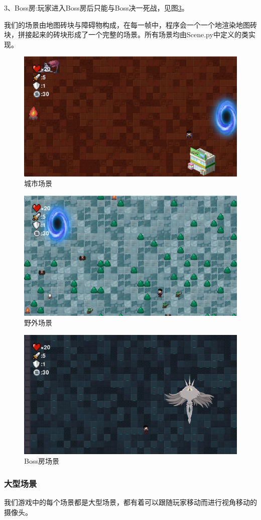 \documentclass{ctexart}
\begin{document}
3、Boss房:玩家进入Boss房后只能与Boss决一死战，见图\ref{fig:场景3}。

我们的场景由地图砖块与障碍物构成，在每一帧中，程序会一个一个地渲染地图砖块，拼接起来的砖块形成了一个完整的场景。所有场景均由Scene.py中定义的类实现。
\begin{figure}
\centering
\includegraphics[width=0.7\linewidth]{场景1.png}
\caption{\label{fig:场景1}城市场景}
\end{figure}

\begin{figure}
\centering
\includegraphics[width=0.7\linewidth]{场景2.png}
\caption{\label{fig:场景2}野外场景}
\end{figure}

\begin{figure}
\centering
\includegraphics[width=0.7\linewidth]{场景3.png}
\caption{\label{fig:场景3}Boss房场景}
\end{figure}

\subsubsection{大型场景}
我们游戏中的每个场景都是大型场景，都有着可以跟随玩家移动而进行视角移动的摄像头。
\end{document}
